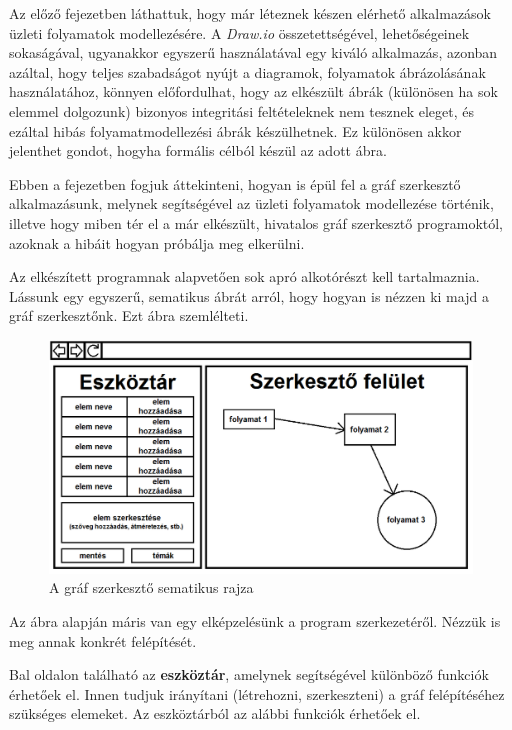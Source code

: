 

Az előző fejezetben láthattuk, hogy már léteznek készen elérhető alkalmazások üzleti folyamatok modellezésére. A \textit{Draw.io} összetettségével, lehetőségeinek sokaságával, ugyanakkor egyszerű használatával egy kiváló alkalmazás, azonban azáltal, hogy teljes szabadságot nyújt a diagramok, folyamatok ábrázolásának használatához, könnyen előfordulhat, hogy az elkészült ábrák (különösen ha sok elemmel dolgozunk) bizonyos integritási feltételeknek nem tesznek eleget, és ezáltal hibás folyamatmodellezési ábrák készülhetnek. Ez különösen akkor jelenthet gondot, hogyha formális célból készül az adott ábra.

Ebben a fejezetben fogjuk áttekinteni, hogyan is épül fel a gráf szerkesztő alkalmazásunk, melynek segítségével az üzleti folyamatok modellezése történik, illetve hogy miben tér el a már elkészült, hivatalos gráf szerkesztő programoktól, azoknak a hibáit hogyan próbálja meg elkerülni.


Az elkészített programnak alapvetően sok apró alkotórészt kell tartalmaznia. Lássunk egy egyszerű, sematikus ábrát arról, hogy hogyan is nézzen ki majd a gráf szerkesztőnk. Ezt  ábra szemlélteti.

\begin{figure}[h]
\centering
\includegraphics[scale=0.5]{images/sematikus.png}
\caption{A gráf szerkesztő sematikus rajza}
\label{fig:sematikus}
\end{figure}

Az ábra alapján máris van egy elképzelésünk a program szerkezetéről. Nézzük is meg annak konkrét felépítését.

Bal oldalon található az \textbf{eszköztár}, amelynek segítségével különböző funkciók érhetőek el. Innen tudjuk irányítani (létrehozni, szerkeszteni) a gráf felépítéséhez szükséges elemeket. Az eszköztárból az alábbi funkciók érhetőek el.

